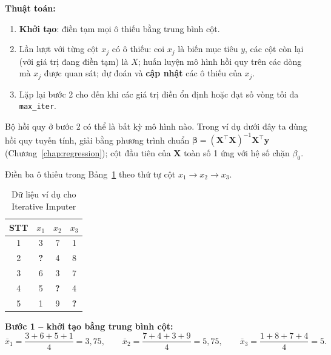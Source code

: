 \noindent\textbf{Thuật toán:}
\begin{enumerate}
    \item \textbf{Khởi tạo}: điền tạm mọi ô thiếu bằng trung bình cột.
    \item Lần lượt với từng cột $x_j$ có ô thiếu: coi $x_j$ là biến mục tiêu $y$, các cột còn lại (với giá trị đang điền tạm) là $X$; huấn luyện mô hình hồi quy trên các dòng mà $x_j$ được quan sát; dự đoán và \textbf{cập nhật} các ô thiếu của $x_j$.
    \item Lặp lại bước 2 cho đến khi các giá trị điền ổn định hoặc đạt số vòng tối đa \texttt{max\_iter}.
\end{enumerate}

Bộ hồi quy ở bước 2 có thể là bất kỳ mô hình nào. Trong ví dụ dưới đây ta dùng hồi quy tuyến tính, giải bằng phương trình chuẩn $\boldsymbol{\beta} = (\mathbf{X}^\top\mathbf{X})^{-1}\mathbf{X}^\top\mathbf{y}$ (Chương~\ref{chap:regression}); cột đầu tiên của $\mathbf{X}$ toàn số 1 ứng với hệ số chặn $\beta_0$.

\begin{example}
Điền ba ô thiếu trong Bảng~\ref{tab:iter-impute} theo thứ tự cột $x_1 \to x_2 \to x_3$.
\end{example}

\begin{table}[H]
\centering
\begin{tabular}{|c|c|c|c|}
\hline
\textbf{STT} & $x_1$ & $x_2$ & $x_3$ \\
\hline
1 & 3 & 7 & 1 \\ \hline
2 & \textbf{?} & 4 & 8 \\ \hline
3 & 6 & 3 & 7 \\ \hline
4 & 5 & \textbf{?} & 4 \\ \hline
5 & 1 & 9 & \textbf{?} \\ \hline
\end{tabular}
\caption{Dữ liệu ví dụ cho Iterative Imputer}
\label{tab:iter-impute}
\end{table}

\noindent\textbf{Bước 1 -- khởi tạo bằng trung bình cột:}
\[
    \bar{x}_1 = \frac{3 + 6 + 5 + 1}{4} = 3{,}75, \qquad
    \bar{x}_2 = \frac{7 + 4 + 3 + 9}{4} = 5{,}75, \qquad
    \bar{x}_3 = \frac{1 + 8 + 7 + 4}{4} = 5.
\]

